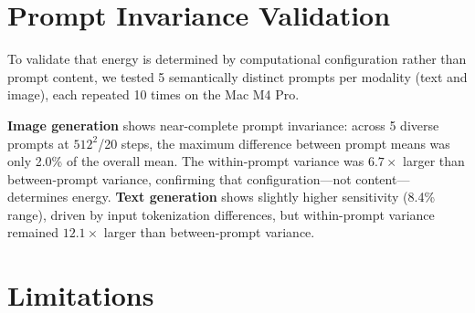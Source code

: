 \documentclass[acmlarge,manuscript,screen,review]{acmart}
\begin{document}
\section{Prompt Invariance Validation}
\label{sec:prompt}

To validate that energy is determined by computational configuration rather than prompt content, we tested 5 semantically distinct prompts per modality (text and image), each repeated 10 times on the Mac M4 Pro.

\textbf{Image generation} shows near-complete prompt invariance: across 5 diverse prompts at $512^2$/20 steps, the maximum difference between prompt means was only 2.0\% of the overall mean. The within-prompt variance was $6.7\times$ larger than between-prompt variance, confirming that configuration---not content---determines energy. \textbf{Text generation} shows slightly higher sensitivity (8.4\% range), driven by input tokenization differences, but within-prompt variance remained $12.1\times$ larger than between-prompt variance.

\section{Limitations}
\label{sec:limitations}
\end{document}
